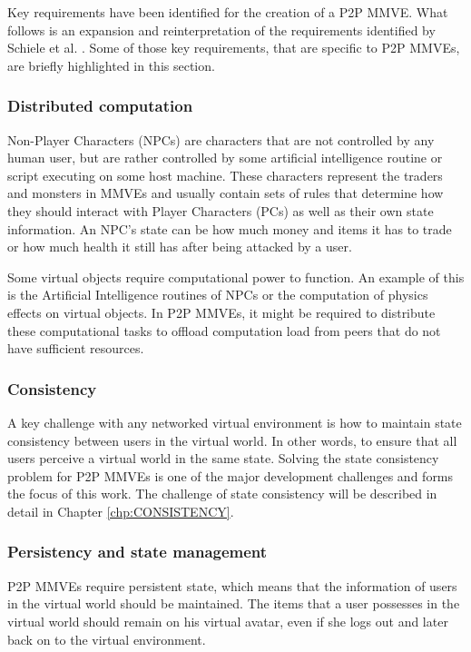 Key requirements have been identified for the creation of a P2P MMVE. What follows is an expansion and reinterpretation of the requirements identified by Schiele et al. \cite{Schiele_p2p_requirements}. Some of those key requirements, that are specific to P2P MMVEs, are briefly highlighted in this section.

\subsubsection{Distributed computation}
\label{distributed_computation_requirement}

Non-Player Characters (NPCs) are characters that are not controlled by any human user, but are rather controlled by some artificial intelligence routine or script executing on some host machine. These characters represent the traders and monsters in MMVEs and usually contain sets of rules that determine how they should interact with Player Characters (PCs) as well as their own state information. An NPC's state can be how much money and items it has to trade or how much health it still has after being attacked by a user.

Some virtual objects require computational power to function. An example of this is the Artificial Intelligence routines of NPCs or the computation of physics effects on virtual objects. In P2P MMVEs, it might be required to distribute these computational tasks to offload computation load from peers that do not have sufficient resources.

\subsubsection{Consistency}
A key challenge with any networked virtual environment is how to maintain state consistency between users in the virtual world. In other words, to ensure that all users perceive a virtual world in the same state. Solving the state consistency problem for P2P MMVEs is one of the major development challenges and forms the focus of this work. The challenge of state consistency will be described in detail in Chapter \ref{chp:CONSISTENCY}.

\subsubsection{Persistency and state management}

P2P MMVEs require persistent state, which means that the information of users in the virtual world should be maintained. The items that a user possesses in the virtual world should remain on his virtual avatar, even if she logs out and later back on to the virtual environment.

